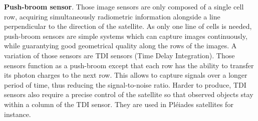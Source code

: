 \textbf{Push-broom sensor}. Those image sensors are only composed of a single cell row, acquiring simultaneously radiometric information alongside a line perpendicular to the direction of the satellite. As only one line of cells is needed, push-broom sensors are simple systems which can capture images continuously, while guarantying good geometrical quality along the rows of the images. A variation of those sensors are TDI sensors (Time Delay Integration). Those sensors function as a push-broom except that each row has the ability to transfer its photon charges to the next row. This allows to capture signals over a longer period of time,  thus reducing the signal-to-noise ratio. Harder to produce, TDI sensors also require a precise control of the satellite so that observed objects stay within a column of the TDI sensor. They are used in Pléiades satellites for instance.

